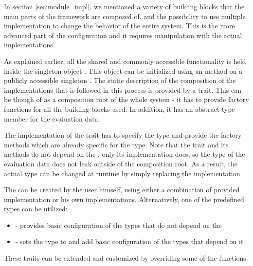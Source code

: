 In section \ref{sec:module_impl}, we mentioned a variety of building blocks that the main parts of the framework are composed of, and the possibility to use multiple implementation to change the behavior of the entire system. This is the more advanced part of the configuration and it requires manipulation with the actual implementations.

As explained earlier, all the shared and commonly accessible functionality is held inside the singleton object . This object can be initialized using an  method on a publicly accessible singleton . The static description of the composition of the implementations that is followed in this process is provided by a  trait. This can be though of as a composition root of the whole system - it has to provide factory functions for all the building blocks used. In addition, it has an abstract type member  for the evaluation data. 


The implementation of the  trait has to specify the  type and provide the factory methods which are already specific for the type. Note that the  trait and its methods do not depend on the , only its implementation does, so the type of the evaluation data does not leak outside of the composition root. As a result, the actual type can be changed at runtime by simply replacing the  implementation.

The  can be created by the user himself, using either a combination of provided implementation or his own implementations. Alternatively, one of the predefined  types can be utilized:

\begin{itemize}
	\item {} - provides basic configuration of the types that do not depend on the 
	\item {} - sets the  type to  and add basic configuration of the types that depend on it
\end{itemize}

These traits can be extended and customized by overriding some of the functions.

